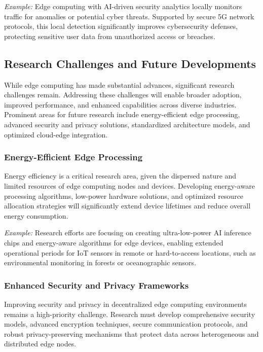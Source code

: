 \documentclass[runningheads]{llncs}
\begin{document}
\textit{Example:} Edge computing with AI-driven security analytics locally monitors traffic for anomalies or potential cyber threats. Supported by secure 5G network protocols, this local detection significantly improves cybersecurity defenses, protecting sensitive user data from unauthorized access or breaches.



\subsection{Research Challenges and Future Developments}

While edge computing has made substantial advances, significant research challenges remain. Addressing these challenges will enable broader adoption, improved performance, and enhanced capabilities across diverse industries. Prominent areas for future research include energy-efficient edge processing, advanced security and privacy solutions, standardized architecture models, and optimized cloud-edge integration.

\subsubsection{Energy-Efficient Edge Processing}
Energy efficiency is a critical research area, given the dispersed nature and limited resources of edge computing nodes and devices. Developing energy-aware processing algorithms, low-power hardware solutions, and optimized resource allocation strategies will significantly extend device lifetimes and reduce overall energy consumption.

\textit{Example:} Research efforts are focusing on creating ultra-low-power AI inference chips and energy-aware algorithms for edge devices, enabling extended operational periods for IoT sensors in remote or hard-to-access locations, such as environmental monitoring in forests or oceanographic sensors.

\subsubsection{Enhanced Security and Privacy Frameworks}
Improving security and privacy in decentralized edge computing environments remains a high-priority challenge. Research must develop comprehensive security models, advanced encryption techniques, secure communication protocols, and robust privacy-preserving mechanisms that protect data across heterogeneous and distributed edge nodes.
\end{document}
